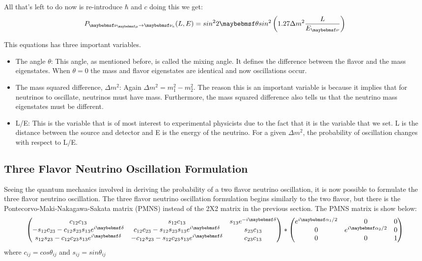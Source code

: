 All that's left to do now is re-introduce $\hbar$ and $c$ doing this we get:
 \begin{equation}
 \centering
 P_{\nu_{\mu} \rightarrow \nu_{e}} (L,E) = sin^{2}2\theta sin^2\left(1.27 \Delta m^2 \frac{L}{E_{\nu}}\right)
 \end{equation}
 
 This equations has three important variables. 
 \begin{itemize}
 \item The angle $\theta$: This angle, as mentioned before, is called the mixing angle. It defines the difference between the flavor and the mass eigenstates. When $\theta = 0$ the mass and flavor eigenstates are identical and now oscillations occur. 
 \item The mass squared difference, $\Delta m^2$: Again $\Delta m^2 = m^2_{1}-m^2_{2}$. The reason this is an important variable is because it implies that for neutrinos to oscillate, neutrinos must have mass. Furthermore, the mass squared difference also tells us that the neutrino mass eigenstates must be different. 
 \item L/E: This is the variable that is of most interest to experimental physicists due to the fact that it is the variable that we set. L is the distance between the source and detector and E is the energy of the neutrino. For a given $\Delta m^2$, the probability of oscillation changes with respect to L/E. 
 \end{itemize}

\subsection{Three Flavor Neutrino Oscillation Formulation}
Seeing the quantum mechanics involved in deriving the probability of a two flavor neutrino oscillation, it is now possible to formulate the three flavor neutrino oscillation. The three flavor neutrino oscillation formulation begins  similarly to the two flavor, but there is the Pontecorvo-Maki-Nakagawa-Sakata matrix (PMNS) instead of the 2X2 matrix in the previous section. The PMNS matrix is show below:
\begin{equation}
\centering
\begin{pmatrix}
c_{12}c_{13} & s_{12}c_{13} & s_{13}e^{-i \delta} \\
-s_{12}c_{23} - c_{12}s_{23}s_{13}e^{i \delta} & c_{12}c_{23} -s_{12}s_{23}s_{13}e^{i \delta} & s_{23}c_{13}\\
s_{12}s_{23} - c_{12}c_{23}s_{13}e^{i \delta} & -c_{12}s_{23} - s_{12}c_{23}s_{13}e^{i \delta} & c_{23}c_{13}
\end{pmatrix} *
\begin{pmatrix}
e^{i \alpha_{1}/2} & 0 & 0\\
0 & e^{i \alpha_{2}/2} & 0\\
0 & 0 &1
\end{pmatrix}
\end{equation} 
where $c_{ij}=cos\theta_{ij}$ and $s_{ij}=sin\theta_{ij}$

